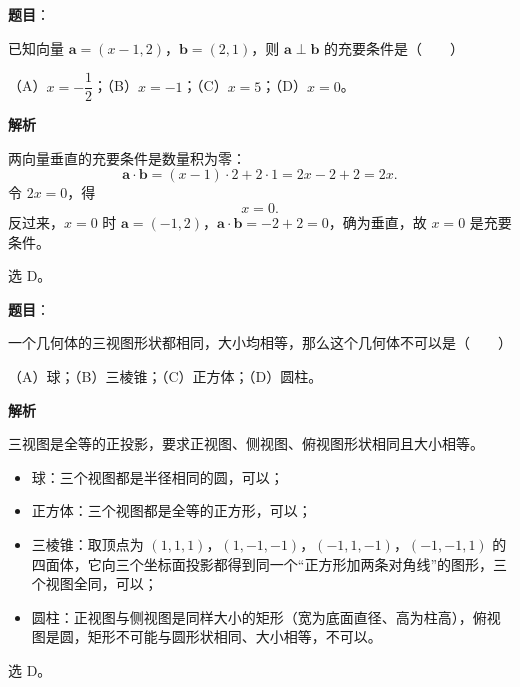 \begin{answer}

\textbf{题目}：

已知向量 $\boldsymbol a=(x-1,2)$，$\boldsymbol b=(2,1)$，则 $\boldsymbol a\perp\boldsymbol b$ 的充要条件是\mbox{（　　）}

（A）$x=-\dfrac12$；（B）$x=-1$；（C）$x=5$；（D）$x=0$。

\textbf{解析}

两向量垂直的充要条件是数量积为零：
\nopagebreak[4]
\[\boldsymbol a\cdot\boldsymbol b=(x-1)\cdot2+2\cdot1=2x-2+2=2x.\]
令 $2x=0$，得
\nopagebreak[4]
\[x=0.\]
反过来，$x=0$ 时 $\boldsymbol a=(-1,2)$，$\boldsymbol a\cdot\boldsymbol b=-2+2=0$，确为垂直，故 $x=0$ 是充要条件。

选 D。


\end{answer}
\begin{answer}

\textbf{题目}：

一个几何体的三视图形状都相同，大小均相等，那么这个几何体不可以是\mbox{（　　）}

（A）球；（B）三棱锥；（C）正方体；（D）圆柱。

\textbf{解析}

三视图是全等的正投影，要求正视图、侧视图、俯视图形状相同且大小相等。

\begin{itemize}
\item 球：三个视图都是半径相同的圆，可以；
\item 正方体：三个视图都是全等的正方形，可以；
\item 三棱锥：取顶点为 $(1,1,1)$，$(1,-1,-1)$，$(-1,1,-1)$，$(-1,-1,1)$ 的四面体，它向三个坐标面投影都得到同一个“正方形加两条对角线”的图形，三个视图全同，可以；
\item 圆柱：正视图与侧视图是同样大小的矩形（宽为底面直径、高为柱高），俯视图是圆，矩形不可能与圆形状相同、大小相等，不可以。
\end{itemize}

选 D。


\end{answer}
